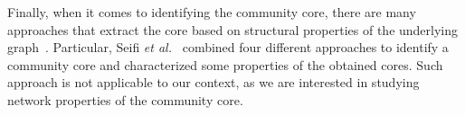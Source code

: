 Finally, when it comes to identifying the community core, there are many approaches that extract the core based on structural properties of the underlying
graph~\cite{Leskovec@www2010,Chakrabarti:2006:EC:1150402.1150467,citeulike:370723,Sachan:2012}.  Particular, 
Seifi \textit{et al.}~\cite{Seifi:2012:CCE:2187980.2188258} combined four different
approaches to identify a community core and characterized some properties of the obtained cores. Such approach is not applicable to our context, as we are interested in studying
network properties of the community core. 


